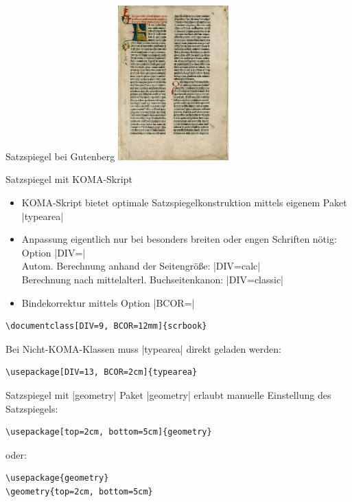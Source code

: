 \documentclass[
	vorläufig=true,
	datum=2016-10-28,
	titel={Allgemeine Formatierung und Pakete},
	web=false,
]{../tex/latexkurs-slides}
\begin{document}
\begin{frame}{Satzspiegel bei Gutenberg}
	\hspace{5.4cm}\includegraphics[height=5.95cm]{01_gutenbergbibel}
\end{frame}

\begin{frame}[fragile]{Satzspiegel mit KOMA-Skript}
\vspace{-2em}
\begin{itemize}
	\item KOMA-Skript bietet optimale Satzspiegelkonstruktion mittels eigenem Paket |typearea|
	\item Anpassung eigentlich nur bei besonders breiten oder engen Schriften nötig: Option |DIV=|
	\\Autom. Berechnung anhand der Seitengröße: |DIV=calc| 
	\\Berechnung nach mittelalterl. Buchseitenkanon: |DIV=classic|
	\item Bindekorrektur mittels Option |BCOR=|
\end{itemize}
\begin{lstlisting}
\documentclass[DIV=9, BCOR=12mm]{scrbook}	
\end{lstlisting}
\vfill
\begin{olcol}
Bei Nicht-KOMA-Klassen muss |typearea| direkt geladen werden:
\begin{lstlisting}
\usepackage[DIV=13, BCOR=2cm]{typearea}
\end{lstlisting}
\end{olcol}
\end{frame}

\begin{frame}[fragile]{Satzspiegel mit |geometry|}%
Paket |geometry|  erlaubt manuelle Einstellung des Satzspiegels:
\begin{lstlisting}
\usepackage[top=2cm, bottom=5cm]{geometry}
\end{lstlisting}
oder:
\begin{lstlisting}
\usepackage{geometry}
\geometry{top=2cm, bottom=5cm}
\end{lstlisting}
\end{frame}
\end{document}
